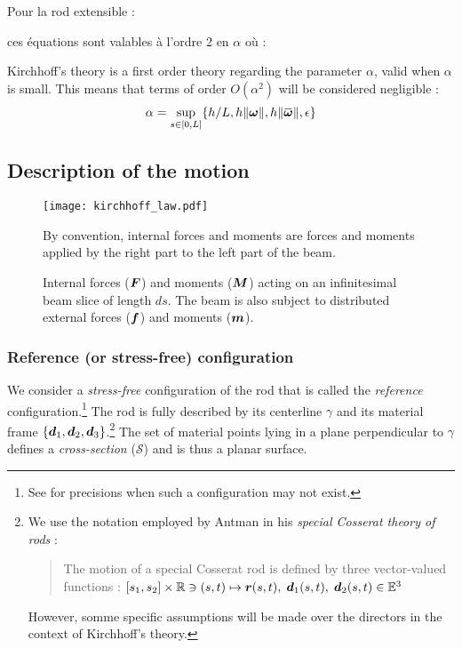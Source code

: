 Pour la rod extensible : \cite{Cisternas2002}

ces équations sont valables à l'ordre 2 en $\alpha$ \cite{Coleman1993} où :

Kirchhoff's theory is a first order theory regarding the parameter $\alpha$, valid when $\alpha$ is small. This means that terms of order $O(\alpha^2)$ will be considered negligible
 :
\begin{equation}
	\alpha = \sup_{s \in [0,L]} \{ h/L, h \norm{\vect{\omega}}, h\norm{\overbar{\vect{\omega}}}, \epsilon \}
\end{equation}

\subsection{Description of the motion}

\begin{figure}[t]
	\centering
	\texttt{[image: kirchhoff\_law.pdf]}
	\caption{Internal forces ($\boldsymbol{F}$) and moments ($\boldsymbol{M}$) acting on an infinitesimal beam slice of length $ds$. The beam is also subject to distributed external forces ($\boldsymbol{f}$) and moments ($\boldsymbol{m}$).} By convention, internal forces and moments are forces and moments applied by the right part to the left part of the beam.
	\label{fig:5_0}
\end{figure}

\subsubsection{Reference (or stress-free) configuration}

We consider a \emph{stress-free} configuration of the rod that is called the \emph{reference} configuration.\footnote{See \cite[p.~20]{Audoly2010} for precisions when such a configuration may not exist.} The rod is fully described by its centerline ${\gamma}$ and its material frame $\{{\boldsymbol{d}_1}, {\boldsymbol{d}_2}, {\boldsymbol{d}_3}\}$.\footnote{We use the notation employed by Antman in his \emph{special Cosserat theory of rods} : \blockcquote[p.~270]{Antman2005}{The motion of a special Cosserat rod is defined by three vector-valued functions : $ [s_1, s_2] \times \mathbb{R} \ni  (s,t) \mapsto \boldsymbol{r}(s,t), \; \boldsymbol{d}_1 (s,t), \; \boldsymbol{d}_2 (s,t) \in \mathbb{E}^3$}. However, somme specific assumptions will be made over the directors in the context of Kirchhoff's theory.} The set of material points lying in a plane perpendicular to ${\gamma}$ defines a \emph{cross-section} ($\mathcal{S}$) and is thus a planar surface. 

